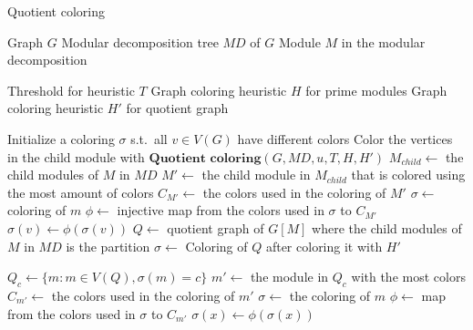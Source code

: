 \documentclass[a4paper]{article}
\begin{document}
\begin{algorithm}[H]
\caption{Quotient coloring}
\begin{algorithmic}[1]
    \REQUIRE Graph $G$ 
    \REQUIRE Modular decomposition tree $MD$ of $G$
    \REQUIRE Module $M$ in the modular decomposition

    \REQUIRE Threshold for heuristic $T$
    \REQUIRE Graph coloring heuristic $H$ for prime modules
    \REQUIRE Graph coloring heuristic $H'$ for quotient graph

    \STATE Initialize a coloring $\sigma$ s.t.\ all $v \in V(G)$
           have different colors
        \STATE Color the vertices in the child module with $\textbf{Quotient coloring}(G,MD,u,T,H,H')$
    \ENDFOR
      \STATE $M_{child} \leftarrow $ the child modules of $M$ in $MD$
      \STATE $M' \leftarrow $ the child module in $M_{child}$ that is colored using the most amount of colors
      \STATE $C_{M'} \leftarrow $ the colors used in the coloring of $M'$
         \STATE $\sigma \leftarrow $ coloring of $m$
         \STATE $\phi \leftarrow $ injective map from the colors used in $\sigma$ to $C_{M'}$
            \STATE $\sigma(v)\leftarrow \phi(\sigma(v))$  
         \ENDFOR
      \ENDFOR
            \RETURN
        \ENDIF
        \STATE $Q \leftarrow $ quotient graph of $G[M]$ where the child modules of $M$ in $MD$ is the partition
        \STATE $\sigma \leftarrow $ Coloring of $Q$ after coloring it with $H'$

            \STATE $Q_c \leftarrow \{ m : m \in V(Q), \sigma(m) = c\}$
            \STATE $m' \leftarrow$ the module in $Q_c$ with the most colors
            \STATE $C_{m'} \leftarrow$ the colors used in the coloring of $m'$
                \STATE $\sigma \leftarrow $ the coloring of $m$
                \STATE $\phi \leftarrow $ map from the colors used in $\sigma$ to $C_{m'}$
                    \STATE $\sigma(x) \leftarrow \phi(\sigma(x))$
                \ENDFOR
            \ENDFOR
        \ENDFOR
    \ENDIF
\end{algorithmic}
\end{algorithm}
\end{document}

